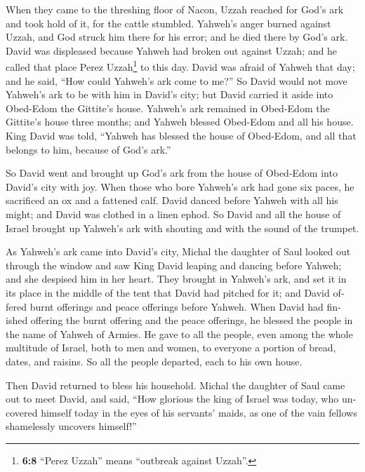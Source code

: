 \begin{paracol}{2}
\begin{otherlanguage}{english}
 When they came to the threshing floor of Nacon, Uzzah
reached for God's ark and took hold of it, for the cattle stumbled.
 Yahweh's anger burned against Uzzah, and God struck him
there for his error; and he died there by God's ark. 
David was displeased because Yahweh had broken out against Uzzah; and he
called that place Perez Uzzah\footnote{\textbf{6:8} ``Perez Uzzah''
  means ``outbreak against Uzzah''.} to this day.  David
was afraid of Yahweh that day; and he said, ``How could Yahweh's ark
come to me?''  So David would not move Yahweh's ark to be
with him in David's city; but David carried it aside into Obed-Edom the
Gittite's house.  Yahweh's ark remained in Obed-Edom the
Gittite's house three months; and Yahweh blessed Obed-Edom and all his
house.  King David was told, ``Yahweh has blessed the
house of Obed-Edom, and all that belongs to him, because of God's ark.''

So David went and brought up God's ark from the house of Obed-Edom into
David's city with joy.  When those who bore Yahweh's ark
had gone six paces, he sacrificed an ox and a fattened calf.
 David danced before Yahweh with all his might; and David
was clothed in a linen ephod.  So David and all the house
of Israel brought up Yahweh's ark with shouting and with the sound of
the trumpet.

 As Yahweh's ark came into David's city, Michal the
daughter of Saul looked out through the window and saw King David
leaping and dancing before Yahweh; and she despised him in her heart.
 They brought in Yahweh's ark, and set it in its place in
the middle of the tent that David had pitched for it; and David offered
burnt offerings and peace offerings before Yahweh.  When
David had finished offering the burnt offering and the peace offerings,
he blessed the people in the name of Yahweh of Armies. 
He gave to all the people, even among the whole multitude of Israel,
both to men and women, to everyone a portion of bread, dates, and
raisins. So all the people departed, each to his own house.

 Then David returned to bless his household. Michal the
daughter of Saul came out to meet David, and said, ``How glorious the
king of Israel was today, who uncovered himself today in the eyes of his
servants' maids, as one of the vain fellows shamelessly uncovers
himself!''


\end{otherlanguage}
\end{paracol}
